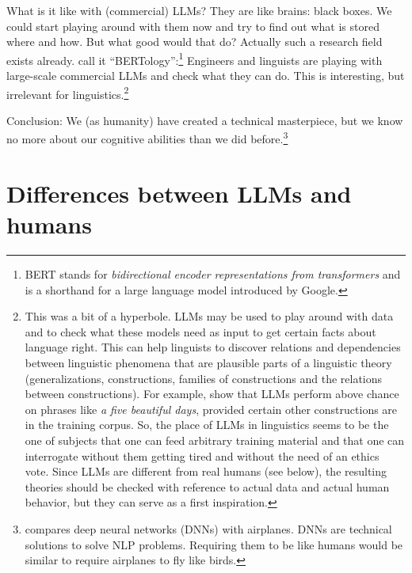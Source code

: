 What is it like with (commercial) LLMs? They are like brains: black boxes. We could start playing around with
them now and try to find out what is stored where and how. But what good would that do? Actually
such a research field exists already. \citet[]{BK2020a} call it ``BERTology'':\footnote{%
  BERT stands for \emph{bidirectional encoder representations from transformers} and is a shorthand
  for a large language model introduced by Google.%
}
Engineers and linguists are playing with large-scale commercial LLMs and check what they can do. This is interesting, but irrelevant for
linguistics.\footnote{%
  This was a bit of a hyperbole. LLMs may be used to play around with data and to check what these
  models need as input to get certain facts about language right. This can help linguists to
  discover relations and dependencies between linguistic phenomena that are plausible parts of a
  linguistic theory (generalizations, constructions, families of constructions and the relations
  between constructions). For example,
  \citet{MisraMahowald2024a} show that LLMs perform above chance on phrases like \emph{a five
    beautiful days}, provided certain other constructions are in the training corpus. So, the place of LLMs in
  linguistics seems to be the one of subjects that one can feed arbitrary training material and that
  one can interrogate without them getting tired and without the need of an ethics vote. Since LLMs
  are different from real humans (see below), the resulting theories should be checked with reference to actual
  data and actual human behavior, but they can serve as a first inspiration.%
} 

Conclusion: We (as humanity) have created a technical masterpiece, but we know no more about our
cognitive abilities than we did before.\footnote{
  \citet[13]{Lappin2024a} compares deep neural networks (DNNs) with airplanes. DNNs are technical solutions to solve NLP
  problems. Requiring them to be like humans would be similar to require airplanes to fly like birds. 
}


\section{Differences between LLMs and humans}
\label{sec-differences-LLMs-humans}

